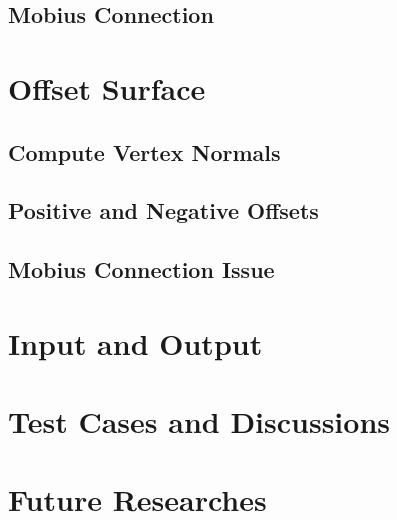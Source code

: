 \documentclass[12pt]{article}
\begin{document}
\subsection{Mobius Connection}

\section{Offset Surface} \label{sec:offset}

\subsection{Compute Vertex Normals}

\subsection{Positive and Negative Offsets}

\subsection{Mobius Connection Issue}

\section{Input and Output}

\section{Test Cases and Discussions}

\section{Future Researches}
\end{document}
